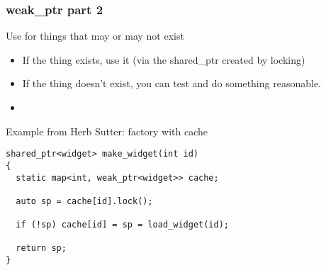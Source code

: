 \begin{frame}[fragile]
\frametitle{weak\_ptr part 2}
Use for things that may or may not exist
\begin{itemize}
\item If the thing exists, use it (via the shared\_ptr created by locking)
\item If the thing doesn't exist, you can test and do something reasonable.
\item {}
\end{itemize}
\pause{}
\vskip 12pt
Example from Herb Sutter: factory with cache
{\scriptsize\begin{verbatim}
shared_ptr<widget> make_widget(int id) 
{
  static map<int, weak_ptr<widget>> cache;

  auto sp = cache[id].lock();

  if (!sp) cache[id] = sp = load_widget(id);

  return sp;
}
\end{verbatim}
}

\vskip 12pt
\pause{}


\end{frame}

